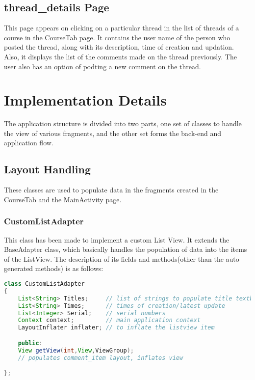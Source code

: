 \documentclass{article}
\begin{document}
\subsection{thread\_details Page}
\par\noindent This page appears on clicking on a particular thread in the list of threads of a course in the CourseTab page. It contains the user name of the person who posted the thread, along with its description, time of creation and updation. Also, it displays the list of the comments made on the thread previously. The user also has an option of podting a new comment on the thread.




\section{Implementation Details}
\par\noindent The application structure is divided into two parts, one set of classes to handle the view of various fragments, and the other set forms the back-end and application flow.
\subsection{Layout Handling}
\par\noindent These classes are used to populate data in the fragments created in the CourseTab and the MainActivity page.

\subsubsection{CustomListAdapter}
\par\noindent This class has been made to implement a custom List View. It extends the BaseAdapter class, which basically handles the population of data into the items of the ListView. The description of its fields and methods(other than the auto generated methods) is as follows:

\begin{lstlisting}[language=Java, caption={Fields \& Methods of CustomListAdapter}]
class CustomListAdapter
{
	List<String> Titles;     // list of strings to populate title textbox
	List<String> Times;	     // times of creation/latest update
	List<Integer> Serial;    // serial numbers
	Context context;	     // main application context
	LayoutInflater inflater; // to inflate the listview item

	public:
	View getView(int,View,ViewGroup);
	// populates comment_item layout, inflates view

};
\end{lstlisting}
\end{document}
